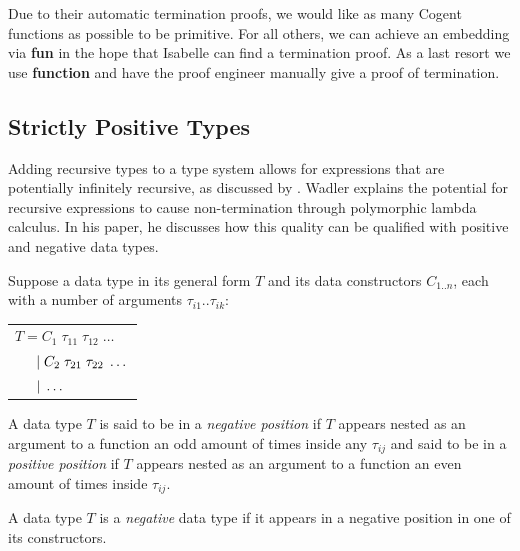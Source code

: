 Due to their automatic termination proofs, we would like as many Cogent functions as possible to be
primitive. For all others, we can achieve an embedding via \textbf{fun} in the hope that Isabelle can find
a termination proof. As a last resort we use \textbf{function} and have the proof engineer 
manually give a proof of termination. 

\subsection{Strictly Positive Types}

Adding recursive types to a type system allows for expressions that are potentially infinitely recursive,
as discussed by \citet{RecursiveTypesForFree}. Wadler explains the potential for recursive expressions
to cause non-termination through polymorphic lambda calculus. In his paper, he discusses how this
quality can be qualified with positive and negative data types.

Suppose a data type in its general form $T$ and its data constructors $C_{1..n}$, each with a number of arguments 
$\tau_{i1}..\tau_{ik}$:

\begin{center}
    \begin{tabular}{l}
        $T = C_1\; \tau_{11} \; \tau_{12} \; \dots$ \\
        $\hspace{1.5em} \vert\; C_2\; \tau_{21} \; \tau_{22} \; \dots$ \\
        $\hspace{1.5em} \vert\; \dots$ \\
    \end{tabular} 
\end{center}

\theoremstyle{definition}
\begin{definition}
    A data type $T$ is said to be in a \textit{negative position} if $T$ appears nested as an argument
    to a function an odd amount of times inside any $\tau_{ij}$ and said to be in a \textit{positive position}
    if $T$ appears nested as an argument to a function an even amount of times inside $\tau_{ij}$.
\end{definition}

\theoremstyle{definition}
\begin{definition}
    A data type $T$ is a \textit{negative} data type if it appears in a negative position 
    in one of its constructors.
\end{definition}

